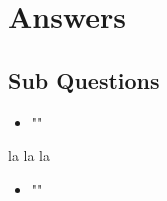 










\section{Answers}

\subsection*{Sub Questions}

\begin{itemize}[ ]
  \item "\mySubRQOne"
\end{itemize}

la la la

\begin{itemize}[ ]
  \item "\mySubRQTwo"
\end{itemize}

